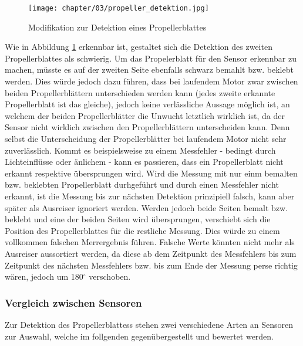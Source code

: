 \begin{figure}[h]
	\centering
	\texttt{[image: chapter/03/propeller\_detektion.jpg]}
	\caption{Modifikation zur Detektion eines Propellerblattes}
	\label{fig:propeller_detektion}
\end{figure}
Wie in Abbildung \ref{fig:propeller_detektion} erkennbar ist, gestaltet sich die Detektion des zweiten Propellerblattes als schwierig. 
Um das Propelerblatt für den Sensor erkennbar zu machen, müsste es auf der zweiten Seite ebenfalls schwarz bemahlt bzw. beklebt werden.
Dies würde jedoch dazu führen, dass bei laufendem Motor zwar zwischen beiden Propellerblättern unterschieden werden kann (jedes zweite erkannte Propellerblatt ist das gleiche), jedoch keine verlässliche Aussage möglich ist, an welchem der beiden Propellerblätter die Unwucht letztlich wirklich ist, da der Sensor nicht wirklich zwischen den Propellerblättern unterscheiden kann.
Denn selbst die Unterscheidung der Propellerblätter bei laufendem Motor nicht sehr zuverlässlich.
Kommt es beispielsweise zu einem Messfehler - bedingt durch Lichteinflüsse oder änlichem - kann es passieren, dass ein Propellerblatt nicht erkannt respektive übersprungen wird.
Wird die Messung mit nur einm bemalten bzw. beklebten Propellerblatt durhgeführt und durch einen Messfehler nicht erkannt, ist die Messung bis zur nächsten Detektion prinzipiell falsch, kann aber später als Ausreiser ignoriert werden.
Werden jedoch beide Seiten bemalt bzw. beklebt und eine der beiden Seiten wird übersprungen, verschiebt sich die Position des Propellerblattes für die restliche Messung.
Dies würde zu einem vollkommen falschen Merrergebnis führen.
Falsche Werte könnten nicht mehr als Ausreiser aussortiert werden, da diese ab dem Zeitpunkt des Messfehlers bis zum Zeitpunkt des nächsten Messfehlers bzw. bis zum Ende der Messung perse richtig wären, jedoch um 180$^\circ$ verschoben.

\subsubsection*{Vergleich zwischen Sensoren}
Zur Detektion des Propellerblattess stehen zwei verschiedene Arten an Sensoren zur Auswahl, welche im follgenden gegenübergestellt und bewertet werden.

